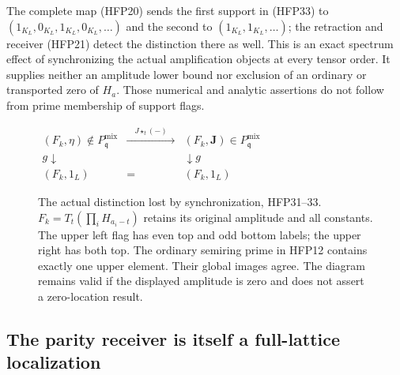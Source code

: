 The complete map (HFP20) sends the first support in
(HFP33) to $(1_{K_L},0_{K_L},1_{K_L},0_{K_L},\ldots)$
and the second to $(1_{K_L},1_{K_L},\ldots)$; the
retraction and receiver (HFP21) detect the distinction
there as well. This is an exact spectrum effect of
synchronizing the actual amplification objects at
every tensor order. It supplies neither an amplitude
lower bound nor exclusion of an ordinary or transported
zero of $H_a$. Those numerical and analytic assertions
do not follow from prime membership of support flags.

\begin{figure}[htbp]
\centering
$\begin{array}{ccc}
 (F_k,\eta)\notin P^{\mathrm{mix}}_{\mathfrak q}
   &\xrightarrow{\quad J\star_t(-)\quad}&
 (F_k,\mathbf J)\in P^{\mathrm{mix}}_{\mathfrak q}\\
 {\scriptstyle g}\downarrow&&\downarrow{\scriptstyle g}\\
 (F_k,1_L)&=&(F_k,1_L)
 \end{array}$
\caption{The actual distinction lost by synchronization, HFP31--33.
$F_k=T_t(\prod_iH_{a_i-t})$ retains its original amplitude and
all constants. The upper left flag has even top and odd bottom
labels; the upper right has both top. The ordinary semiring
prime in HFP12 contains exactly one upper element. Their
global images agree. The diagram remains valid if the
displayed amplitude is zero and does not assert a zero-location result.}
\end{figure}

\subsection{The parity receiver is itself a full-lattice localization}

